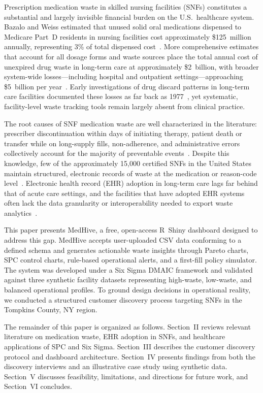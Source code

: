 \documentclass[letterpaper, 10pt, conference]{IEEEconf}
\begin{document}
Prescription medication waste in skilled nursing facilities (SNFs) constitutes
a substantial and largely invisible financial burden on the U.S.\ healthcare
system.
Bazalo and Weiss estimated that unused solid oral medications dispensed to
Medicare Part~D residents in nursing facilities cost approximately \$125~million
annually, representing 3\% of total dispensed cost~\cite{Bazalo2011Measurement}.
More comprehensive estimates that account for all dosage forms and waste sources
place the total annual cost of unexpired drug waste in long-term care at
approximately \$2~billion, with broader system-wide losses---including hospital
and outpatient settings---approaching \$5~billion per year~\cite{Lenzer2014US}.
Early investigations of drug discard patterns in long-term care facilities
documented these losses as far back as 1977~\cite{Ciullo1977Drug}, yet
systematic, facility-level waste tracking tools remain largely absent from
clinical practice.

The root causes of SNF medication waste are well characterized in the
literature: prescriber discontinuation within days of initiating therapy,
patient death or transfer while on long-supply fills, non-adherence, and
administrative errors collectively account for the majority of
preventable events~\cite{Bekker2018Patient, Morgan2001The}.
Despite this knowledge, few of the approximately 15,000 certified SNFs in the
United States maintain structured, electronic records of waste at the
medication or reason-code level~\cite{Chambers2016Assessing}.
Electronic health record (EHR) adoption in long-term care lags far behind
that of acute care settings, and the facilities that have adopted EHR systems
often lack the data granularity or interoperability needed to export waste
analytics~\cite{Kruse2015Adoption, Vest2019Adoption}.

This paper presents MedHive, a free, open-access R~Shiny dashboard designed
to address this gap.
MedHive accepts user-uploaded CSV data conforming to a defined schema and
generates actionable waste insights through Pareto charts, SPC control charts,
rule-based operational alerts, and a first-fill policy simulator.
The system was developed under a Six Sigma DMAIC framework and validated
against three synthetic facility datasets representing high-waste, low-waste,
and balanced operational profiles.
To ground design decisions in operational reality, we conducted a structured
customer discovery process targeting SNFs in the Tompkins County, NY region.

The remainder of this paper is organized as follows.
Section~II reviews relevant literature on medication waste, EHR adoption in
SNFs, and healthcare applications of SPC and Six Sigma.
Section~III describes the customer discovery protocol and dashboard
architecture.
Section~IV presents findings from both the discovery interviews and an
illustrative case study using synthetic data.
Section~V discusses feasibility, limitations, and directions for future work,
and Section~VI concludes.
\end{document}
